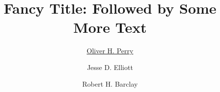 \documentclass[14pt,aspectratio=169]{beamer}
\title{Fancy Title: Followed by Some More Text}
\author{\underline{Oliver H. Perry} \inst{1} \and Jesse D. Elliott \inst{2} \and Robert H. Barclay \inst{2}}
\institute[shortinst]{\inst{1} Some Institute \and \inst{2} Another Institute}
\begin{document}
\begin{frame}
  \titlepage
\end{frame}


\end{document}
